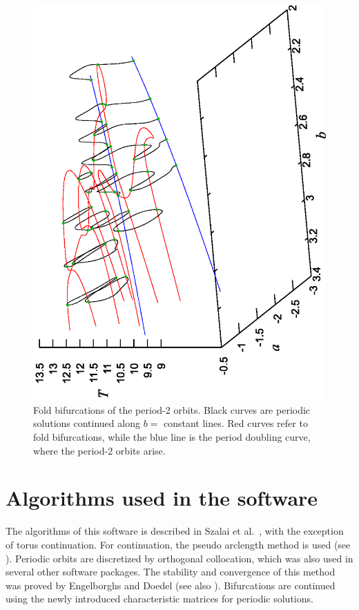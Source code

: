 \documentclass[10pt,a4paper]{ddedoc}
\begin{document}
\begin{figure}
\begin{center}
\includegraphics[scale=0.6,angle=270]{fig/fold3d-2.eps}
\end{center}
\caption{Fold bifurcations of the period-2 orbits. Black curves are periodic solutions continued along $b=$ constant lines. Red curves refer to fold bifurcations, while the blue line is the period doubling curve, where the period-2 orbits arise. }
\label{pdfold}
\end{figure}

\section{Algorithms used in the software}

The algorithms of this software is described in Szalai et al.\ \cite{szalai-cont}, with the exception of torus continuation. For continuation, the pseudo arclength method is used (see \cite{handbook, tutorial1, tutorial2}). Periodic orbits are discretized by orthogonal collocation, which was also used in several other software packages. The stability and convergence of this method was proved by Engelborghs and Doedel \cite{engstab} (see also \cite{engcol}). Bifurcations are continued using the newly introduced characteristic matrices for periodic solutions.
\end{document}
